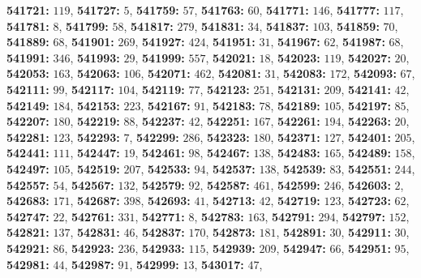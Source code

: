\textsf{\bfseries 541721:} $119$, \textsf{\bfseries 541727:} $5$, \textsf{\bfseries 541759:} $57$, \textsf{\bfseries 541763:} $60$, \textsf{\bfseries 541771:} $146$, \textsf{\bfseries 541777:} $117$, \textsf{\bfseries 541781:} $8$, \textsf{\bfseries 541799:} $58$, \textsf{\bfseries 541817:} $279$, \textsf{\bfseries 541831:} $34$, \textsf{\bfseries 541837:} $103$, \textsf{\bfseries 541859:} $70$, \textsf{\bfseries 541889:} $68$, \textsf{\bfseries 541901:} $269$, \textsf{\bfseries 541927:} $424$, \textsf{\bfseries 541951:} $31$, \textsf{\bfseries 541967:} $62$, \textsf{\bfseries 541987:} $68$, \textsf{\bfseries 541991:} $346$, \textsf{\bfseries 541993:} $29$, \textsf{\bfseries 541999:} $557$, \textsf{\bfseries 542021:} $18$, \textsf{\bfseries 542023:} $119$, \textsf{\bfseries 542027:} $20$, \textsf{\bfseries 542053:} $163$, \textsf{\bfseries 542063:} $106$, \textsf{\bfseries 542071:} $462$, \textsf{\bfseries 542081:} $31$, \textsf{\bfseries 542083:} $172$, \textsf{\bfseries 542093:} $67$, \textsf{\bfseries 542111:} $99$, \textsf{\bfseries 542117:} $104$, \textsf{\bfseries 542119:} $77$, \textsf{\bfseries 542123:} $251$, \textsf{\bfseries 542131:} $209$, \textsf{\bfseries 542141:} $42$, \textsf{\bfseries 542149:} $184$, \textsf{\bfseries 542153:} $223$, \textsf{\bfseries 542167:} $91$, \textsf{\bfseries 542183:} $78$, \textsf{\bfseries 542189:} $105$, \textsf{\bfseries 542197:} $85$, \textsf{\bfseries 542207:} $180$, \textsf{\bfseries 542219:} $88$, \textsf{\bfseries 542237:} $42$, \textsf{\bfseries 542251:} $167$, \textsf{\bfseries 542261:} $194$, \textsf{\bfseries 542263:} $20$, \textsf{\bfseries 542281:} $123$, \textsf{\bfseries 542293:} $7$, \textsf{\bfseries 542299:} $286$, \textsf{\bfseries 542323:} $180$, \textsf{\bfseries 542371:} $127$, \textsf{\bfseries 542401:} $205$, \textsf{\bfseries 542441:} $111$, \textsf{\bfseries 542447:} $19$, \textsf{\bfseries 542461:} $98$, \textsf{\bfseries 542467:} $138$, \textsf{\bfseries 542483:} $165$, \textsf{\bfseries 542489:} $158$, \textsf{\bfseries 542497:} $105$, \textsf{\bfseries 542519:} $207$, \textsf{\bfseries 542533:} $94$, \textsf{\bfseries 542537:} $138$, \textsf{\bfseries 542539:} $83$, \textsf{\bfseries 542551:} $244$, \textsf{\bfseries 542557:} $54$, \textsf{\bfseries 542567:} $132$, \textsf{\bfseries 542579:} $92$, \textsf{\bfseries 542587:} $461$, \textsf{\bfseries 542599:} $246$, \textsf{\bfseries 542603:} $2$, \textsf{\bfseries 542683:} $171$, \textsf{\bfseries 542687:} $398$, \textsf{\bfseries 542693:} $41$, \textsf{\bfseries 542713:} $42$, \textsf{\bfseries 542719:} $123$, \textsf{\bfseries 542723:} $62$, \textsf{\bfseries 542747:} $22$, \textsf{\bfseries 542761:} $331$, \textsf{\bfseries 542771:} $8$, \textsf{\bfseries 542783:} $163$, \textsf{\bfseries 542791:} $294$, \textsf{\bfseries 542797:} $152$, \textsf{\bfseries 542821:} $137$, \textsf{\bfseries 542831:} $46$, \textsf{\bfseries 542837:} $170$, \textsf{\bfseries 542873:} $181$, \textsf{\bfseries 542891:} $30$, \textsf{\bfseries 542911:} $30$, \textsf{\bfseries 542921:} $86$, \textsf{\bfseries 542923:} $236$, \textsf{\bfseries 542933:} $115$, \textsf{\bfseries 542939:} $209$, \textsf{\bfseries 542947:} $66$, \textsf{\bfseries 542951:} $95$, \textsf{\bfseries 542981:} $44$, \textsf{\bfseries 542987:} $91$, \textsf{\bfseries 542999:} $13$, \textsf{\bfseries 543017:} $47$, 
